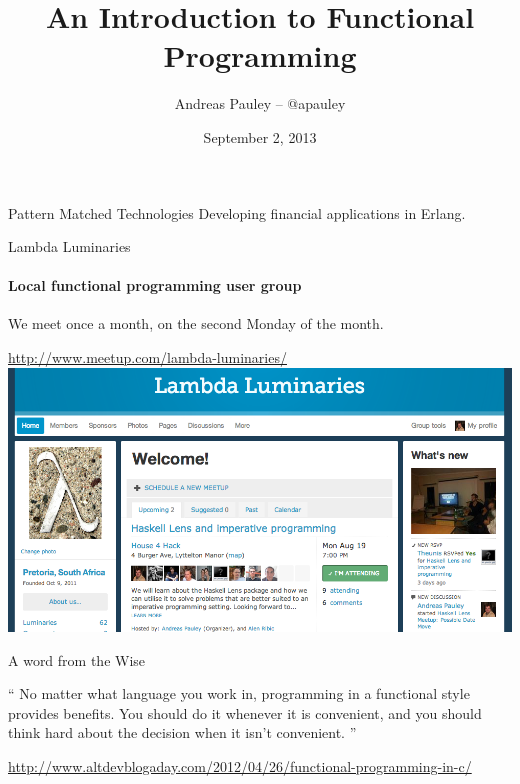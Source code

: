 \documentclass{beamer}
\title[Functional Programming]{An Introduction to Functional Programming}
\author{Andreas Pauley -- @apauley}
\institute{Pattern Matched Technologies\\Lambda Luminaries}
\date{September 2, 2013}
\begin{document}
\begin{frame}
\titlepage
\end{frame}

\begin{frame}{Pattern Matched Technologies}
Developing financial applications in Erlang.
\end{frame}

\begin{frame}{Lambda Luminaries}
\framesubtitle{Local functional programming user group}
We meet once a month, on the second Monday of the month.

\url{http://www.meetup.com/lambda-luminaries/}
\includegraphics[scale=0.3]{img/LambdaLuminariesScreenShot2013-08-09.png}

\end{frame}

\begin{frame}{A word from the Wise}

\begin{exampleblock}{}
  {\large ``
No matter what language you work in, programming
in a functional style provides benefits.
You should do it whenever it is convenient, and you
should think hard about the decision when it isn’t convenient.
  ''}
  \vskip5mm
  \hspace*{}
\end{exampleblock}


\url{http://www.altdevblogaday.com/2012/04/26/functional-programming-in-c/}

\end{frame}
\end{document}
